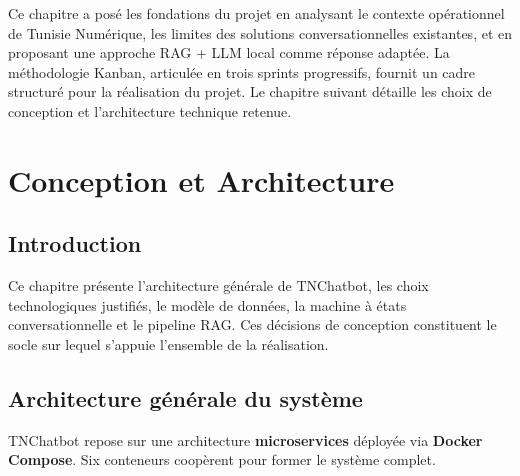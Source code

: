 \documentclass[12pt,a4paper]{report}
\begin{document}
Ce chapitre a posé les fondations du projet en analysant le contexte opérationnel de
Tunisie Numérique, les limites des solutions conversationnelles existantes, et en proposant
une approche RAG + LLM local comme réponse adaptée. La méthodologie Kanban, articulée
en trois sprints progressifs, fournit un cadre structuré pour la réalisation du projet.
Le chapitre suivant détaille les choix de conception et l'architecture technique retenue.

\chapter{Conception et Architecture}
\minitoc
\newpage

\section{Introduction}

Ce chapitre présente l'architecture générale de TNChatbot, les choix technologiques
justifiés, le modèle de données, la machine à états conversationnelle et le pipeline RAG.
Ces décisions de conception constituent le socle sur lequel s'appuie l'ensemble de la
réalisation.

\section{Architecture générale du système}

TNChatbot repose sur une architecture \textbf{microservices} déployée via
\textbf{Docker Compose}. Six conteneurs coopèrent pour former le système complet.
\end{document}

